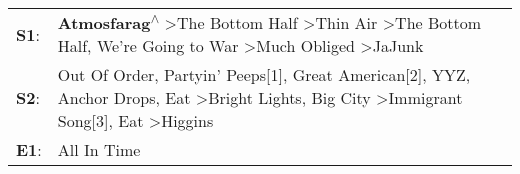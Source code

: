 \begin{supertabular}{p{0.03\textwidth}p{0.92\textwidth}}
 \textbf{S1}:  &                                                                              \textbf{Atmosfarag\textsuperscript{$\wedge$}} \textgreater \enspace The Bottom Half\textsuperscript{} \textgreater \enspace Thin Air\textsuperscript{} \textgreater \enspace The Bottom Half\textsuperscript{}, \enspace We're Going to War\textsuperscript{} \textgreater \enspace Much Obliged\textsuperscript{} \textgreater \enspace JaJunk\textsuperscript{}  \enspace  \\
 \textbf{S2}:  &  Out Of Order\textsuperscript{}, \enspace Partyin' Peeps[1]\textsuperscript{}, \enspace Great American[2]\textsuperscript{}, \enspace YYZ\textsuperscript{}, \enspace Anchor Drops\textsuperscript{}, \enspace Eat\textsuperscript{} \textgreater \enspace Bright Lights, Big City\textsuperscript{} \textgreater \enspace Immigrant Song[3]\textsuperscript{}, \enspace Eat\textsuperscript{} \textgreater \enspace Higgins\textsuperscript{}  \enspace  \\
 \textbf{E1}:  &                                                                                                                                                                                                                                                                                                                                                                                                                  All In Time\textsuperscript{}  \enspace  \\
\end{supertabular}
